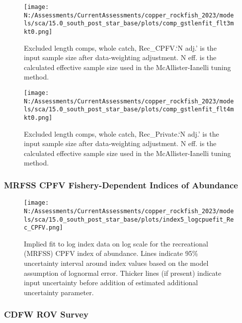 \documentclass[11pt,
  english,
  letterpaper,
]{article}
\begin{document}
\begin{figure}
\centering
\texttt{[image: N:/Assessments/CurrentAssessments/copper\_rockfish\_2023/models/sca/15.0\_south\_post\_star\_base/plots/comp\_gstlenfit\_flt3mkt0.png]}
\caption{Excluded length comps, whole catch, Rec\_CPFV.`N adj.' is the input sample size after data-weighting adjustment. N eff. is the calculated effective sample size used in the McAllister-Ianelli tuning method.\label{fig:comp_gstlenfit_flt3mkt0}}
\end{figure}

\begin{figure}
\centering
\texttt{[image: N:/Assessments/CurrentAssessments/copper\_rockfish\_2023/models/sca/15.0\_south\_post\_star\_base/plots/comp\_gstlenfit\_flt4mkt0.png]}
\caption{Excluded length comps, whole catch, Rec\_Private.`N adj.' is the input sample size after data-weighting adjustment. N eff. is the calculated effective sample size used in the McAllister-Ianelli tuning method.\label{fig:comp_gstlenfit_flt4mkt0}}
\end{figure}

\pagebreak

\hypertarget{mrfss-cpfv-fishery-dependent-indices-of-abundance}{%
\subsubsection{MRFSS CPFV Fishery-Dependent Indices of Abundance}\label{mrfss-cpfv-fishery-dependent-indices-of-abundance}}

\begin{figure}
\centering
\texttt{[image: N:/Assessments/CurrentAssessments/copper\_rockfish\_2023/models/sca/15.0\_south\_post\_star\_base/plots/index5\_logcpuefit\_Rec\_CPFV.png]}
\caption{Implied fit to log index data on log scale for the recreational (MRFSS) CPFV index of abundance. Lines indicate 95\% uncertainty interval around index values based on the model assumption of lognormal error. Thicker lines (if present) indicate input uncertainty before addition of estimated additional uncertainty parameter.\label{fig:mrfss-cpfv-index-fit}}
\end{figure}

\pagebreak

\hypertarget{cdfw-rov-survey}{%
\subsubsection{CDFW ROV Survey}\label{cdfw-rov-survey}}
\end{document}
